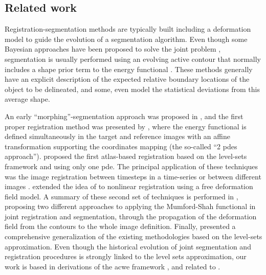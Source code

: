 \subsection{Related work}
\label{sec:methods_background}
Registration-segmentation methods are typically built including a deformation
  model to guide the evolution of a segmentation algorithm.
Even though some Bayesian approaches have been proposed to solve the joint problem
  \citep{wyatt_map_2003}, segmentation is usually performed using an evolving
  active contour \citep{chan_active_2001} that normally includes a shape prior
  term to the energy functional \citep{chen_using_2002,bresson_variational_2006,
  chan_level_2005,cremers_kernel_2006,gastaud_combining_2004}.
These methods generally have an explicit description of the expected relative boundary
  locations of the object to be delineated, and some, even model the statistical deviations
  from this average shape.


An early ``morphing''-segmentation approach was proposed in \citep{bertalmio_morphing_2000},
  and the first proper registration method was presented by \citeauthor{yezzi_variational_2001}
  \citep{yezzi_variational_2001}, where the energy functional is defined simultaneously in the target
  and reference images with an affine transformation supporting the coordinates mapping
  (the so-called ``2 \glspl*{pde} approach'').
\citeauthor{vemuri_joint_2003} proposed the first atlas-based registration \citep{vemuri_joint_2003}
  based on the level-sets framework and using only one \gls*{pde}.
The principal application of these techniques was the image registration between timesteps in
  a time-series or between different images \citep{paragios_level_2003}.
\citeauthor{unal_coupled_2005} \citep{unal_coupled_2005} extended the idea of
  \citep{bertalmio_morphing_2000,yezzi_variational_2001} to nonlinear registration
  using a free deformation field model.
A summary of these second set of techniques is performed in \citep{droske_mumfordshah_2009},
  proposing two different approaches to applying the Mumford-Shah \citep{mumford_optimal_1989}
  functional in joint registration and segmentation, through the propagation of the deformation
  field from the contours to the whole image definition.
Finally, \citeauthor{gorthi_active_2011} presented a comprehensive generalization of the
  existing methodologies \citep{gorthi_active_2011} based on the level-sets approximation.
Even though the historical evolution of joint segmentation and registration procedures is strongly
  linked to the level sets approximation, our work is based in derivations of the \acrlong{acwe}
  framework \citep{chan_active_2001}, and related to \citep{guyader_combined_2011}.


